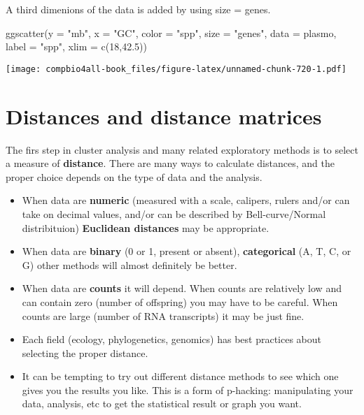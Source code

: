 \documentclass[
]{book}
\newenvironment{Shaded}{\begin{snugshade}}{\end{snugshade}}
\newcommand{\AttributeTok}[1]{\textcolor[rgb]{0.77,0.63,0.00}{#1}}
\newcommand{\DecValTok}[1]{\textcolor[rgb]{0.00,0.00,0.81}{#1}}
\newcommand{\FloatTok}[1]{\textcolor[rgb]{0.00,0.00,0.81}{#1}}
\newcommand{\FunctionTok}[1]{\textcolor[rgb]{0.00,0.00,0.00}{#1}}
\newcommand{\NormalTok}[1]{#1}
\newcommand{\StringTok}[1]{\textcolor[rgb]{0.31,0.60,0.02}{#1}}
\begin{document}
A third dimenions of the data is added by using size = genes.

\begin{Shaded}
\begin{Highlighting}[]
\FunctionTok{ggscatter}\NormalTok{(}\AttributeTok{y =} \StringTok{"mb"}\NormalTok{,}
          \AttributeTok{x =} \StringTok{"GC"}\NormalTok{,}
          \AttributeTok{color =} \StringTok{"spp"}\NormalTok{,}
          \AttributeTok{size =} \StringTok{"genes"}\NormalTok{,}
          \AttributeTok{data =}\NormalTok{ plasmo,}
          \AttributeTok{label =} \StringTok{"spp"}\NormalTok{,}
          \AttributeTok{xlim =} \FunctionTok{c}\NormalTok{(}\DecValTok{18}\NormalTok{,}\FloatTok{42.5}\NormalTok{)) }
\end{Highlighting}
\end{Shaded}

\texttt{[image: compbio4all-book\_files/figure-latex/unnamed-chunk-720-1.pdf]}

\hypertarget{distances-and-distance-matrices}{%
\section{Distances and distance matrices}\label{distances-and-distance-matrices}}

The firs step in cluster analysis and many related exploratory methods is to select a measure of \textbf{distance}. There are many ways to calculate distances, and the proper choice depends on the type of data and the analysis.

\begin{itemize}
\item
  When data are \textbf{numeric} (measured with a scale, calipers, rulers and/or can take on decimal values, and/or can be described by Bell-curve/Normal distribituion) \textbf{Euclidean distances} may be appropriate.\\
\item
  When data are \textbf{binary} (0 or 1, present or absent), \textbf{categorical} (A, T, C, or G) other methods will almost definitely be better.
\item
  When data are \textbf{counts} it will depend. When counts are relatively low and can contain zero (number of offspring) you may have to be careful. When counts are large (number of RNA transcripts) it may be just fine.
\item
  Each field (ecology, phylogenetics, genomics) has best practices about selecting the proper distance.
\item
  It can be tempting to try out different distance methods to see which one gives you the results you like. This is a form of p-hacking: manipulating your data, analysis, etc to get the statistical result or graph you want.
\end{itemize}
\end{document}
